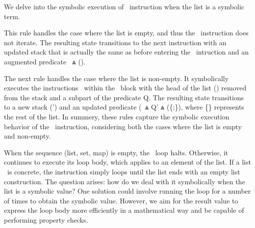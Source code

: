 \documentclass[a4paper,UKenglish,cleveref, autoref, thm-restate]{lipics-v2021}
\begin{document}
We delve into the symbolic execution of \ITER\ instruction when the list is a symbolic term.
\begin{mathpar}
\end{mathpar}
This rule handles the case where the list is empty, and thus the \ITER\ instruction does not iterate. The resulting state transitions to the next instruction with an updated stack that is actually the same as before entering the \ITER\ intruction and an augmented predicate \PREDICATE\ $\Wedge$ (\StackOne \EQUAL \EMPTYLIST).
\begin{mathpar}
\end{mathpar}
The next rule handles the case where the list is non-empty. It symbolically executes the instructions \INSTRUCTIONONE\ within the \ITER\ block with the head of the list (\HEAD) removed from the stack and a subpart of the predicate Q. The resulting state transitions to a new stack (\STACK') and an updated predicate (\PREDICATE\ $\Wedge$ Q' $\Wedge$ (\StackOne \EQUAL \{\HEAD;\STAIL\}), where \{\STAIL\} represents the rest of the list.
In summery, these rules capture the symbolic execution behavior of the \ITER\ instruction, considering both the cases where the list is empty and non-empty.

When the sequence (list, set, map) is empty, the \ITER\ loop halts. Otherwise, it continues to execute its loop body, which applies to an element of the list. If a list \LIST\ is concrete, the instruction simply loops until the list ends with an empty list construction. The question arises: how do we deal with it symbolically when the list is a symbolic value? One solution could involve running the loop for a number of times to obtain the symbolic value. However, we aim for the result value to express the loop body more efficiently in a mathematical way and be capable of performing property checks.
\end{document}
